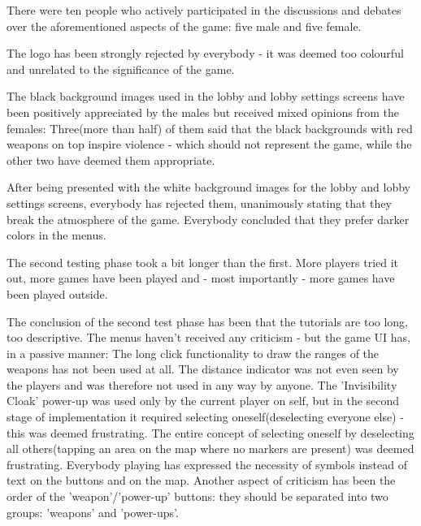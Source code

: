 There were ten people who actively participated in the discussions and debates
over the aforementioned aspects of the game: five male and five female.\newline

The logo has been strongly rejected by everybody - it was deemed too colourful
and unrelated to the significance of the game.\newline

The black background images used in the lobby and lobby settings screens have
been positively appreciated by the males but received mixed opinions from the
females: Three(more than half) of them said that the black backgrounds with
red weapons on top inspire violence - which should not represent the game, while
the other two have deemed them appropriate.\newline

After being presented with the white background images for the lobby and lobby
settings screens, everybody has rejected them, unanimously stating that they
break the atmosphere of the game. Everybody concluded that they prefer darker
colors in the menus.\newline

The second testing phase took a bit longer than the first. More players tried it
out, more games have been played and - most importantly - more games have been
played outside.\newline

The conclusion of the second test phase has been that the tutorials are too
long, too descriptive. The menus haven't received any criticism - but the game
UI has, in a passive manner: The long click functionality to draw the ranges of
the weapons has not been used at all. The distance indicator was not even seen
by the players and was therefore not used in any way by anyone. The
'Invisibility Cloak' power-up was used only by the current player on self, but
in the second stage of implementation it required selecting oneself(deselecting
everyone else) - this was deemed frustrating. The entire concept of selecting
oneself by deselecting all others(tapping an area on the map where no markers
are present) was deemed frustrating. Everybody playing has expressed the
necessity of symbols instead of text on the buttons and on the map. Another
aspect of criticism has been the order of the 'weapon'/'power-up' buttons: they
should be separated into two groups: 'weapons' and 'power-ups'.\newline

